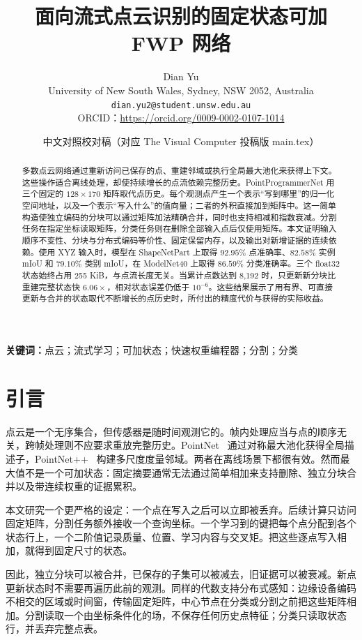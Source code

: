 \documentclass[UTF8,a4paper,11pt,fontset=windows]{ctexart}
\title{面向流式点云识别的固定状态可加 FWP 网络}
\author{Dian Yu\\
University of New South Wales, Sydney, NSW 2052, Australia\\
\texttt{dian.yu2@student.unsw.edu.au}\\
ORCID：\url{https://orcid.org/0009-0002-0107-1014}}
\date{中文对照校对稿（对应 The Visual Computer 投稿版 main.tex）}
\begin{document}
\maketitle

\begin{abstract}
多数点云网络通过重新访问已保存的点、重建邻域或执行全局最大池化来获得上下文。这些操作适合离线处理，却使持续增长的点流依赖完整历史。PointProgrammerNet 用三个固定的 $128\times170$ 矩阵取代点历史。每个观测点产生一个表示“写到哪里”的归一化空间地址，以及一个表示“写入什么”的值向量；二者的外积直接加到矩阵中。这一简单构造使独立编码的分块可以通过矩阵加法精确合并，同时也支持相减和指数衰减。分割任务在指定坐标读取矩阵，分类任务则在删除全部输入点后仅使用矩阵。本文证明输入顺序不变性、分块与分布式编码等价性、固定保留内存，以及输出对新增证据的连续依赖。使用 XYZ 输入时，模型在 ShapeNetPart 上取得 $92.95\%$ 点准确率、$82.58\%$ 实例 mIoU 和 $79.10\%$ 类别 mIoU，在 ModelNet40 上取得 $86.59\%$ 分类准确率。三个 float32 状态始终占用 255 KiB，与点流长度无关。当累计点数达到 8,192 时，只更新新分块比重建完整状态快 $6.06\times$，相对状态误差仍低于 $10^{-6}$。这些结果展示了用有界、可直接更新与合并的状态取代不断增长的点历史时，所付出的精度代价与获得的实际收益。
\end{abstract}

\noindent\textbf{关键词：}点云；流式学习；可加状态；快速权重编程器；分割；分类

\section{引言}
点云是一个无序集合，但传感器是随时间观测它的。帧内处理应当与点的顺序无关，跨帧处理则不应要求重放完整历史。PointNet~\cite{qi2017pointnet} 通过对称最大池化获得全局描述子，PointNet++~\cite{qi2017pointnetplusplus} 构建多尺度度量邻域。两者在离线场景下都很有效。然而最大值不是一个可加状态：固定摘要通常无法通过简单相加来支持删除、独立分块合并以及带连续权重的证据累积。

本文研究一个更严格的设定：一个点在写入之后可以立即被丢弃。后续计算只访问固定矩阵，分割任务额外接收一个查询坐标。一个学习到的键把每个点分配到各个状态行上，一个二阶值记录质量、位置、学习内容与交叉矩。把这些逐点写入相加，就得到固定尺寸的状态。

因此，独立分块可以被合并，已保存的子集可以被减去，旧证据可以被衰减。新点更新状态时不需要再遍历此前的观测。同样的代数支持分布式感知：边缘设备编码不相交的区域或时间窗，传输固定矩阵，中心节点在分类或分割之前把这些矩阵相加。分割读取一个由坐标条件化的场，不保存任何历史点特征；分类只读取状态行，并丢弃完整点表。
\end{document}
